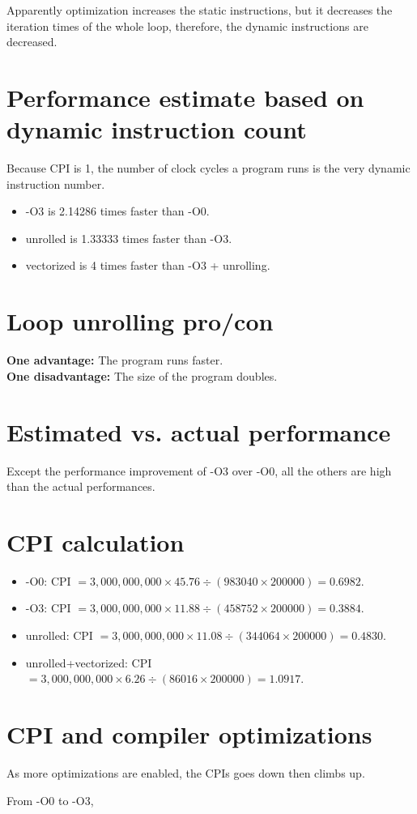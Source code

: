 \documentclass[12pt,letterpaper]{article}
\begin{document}
Apparently optimization increases the static instructions, but it
decreases the iteration times of the whole loop, therefore, the dynamic
instructions are decreased.

\section{Performance estimate based on dynamic instruction count}
Because CPI is 1, the number of clock cycles a program runs is the very
dynamic instruction number.

\begin{itemize}
    \item -O3 is 2.14286 times faster than -O0.
    \item unrolled is 1.33333 times faster than -O3.
    \item vectorized is 4 times faster than -O3 + unrolling.
\end{itemize}

\section{Loop unrolling pro/con}
\textbf{One advantage:} The program runs faster.
\\
\textbf{One disadvantage:} The size of the program doubles.

\section{Estimated vs. actual performance}
Except the performance improvement of -O3 over -O0, all the others
are high than the actual performances.

\section{CPI calculation}
\begin{itemize}
    \item -O0: CPI $=3,000,000,000 \times 45.76 \div (983040 \times
     200000) = 0.6982$.
     \item -O3: CPI $=3,000,000,000 \times 11.88 \div (458752 \times
     200000) = 0.3884$.
     \item unrolled: CPI $=3,000,000,000 \times 11.08 \div (344064
      \times 200000) = 0.4830$.
     \item unrolled+vectorized: CPI $=3,000,000,000 \times 6.26 \div
      (86016 \times 200000) = 1.0917$.
\end{itemize}

\section{CPI and compiler optimizations}
As more optimizations are enabled, the CPIs goes down then climbs
up. 

From -O0 to -O3, 
\end{document}
